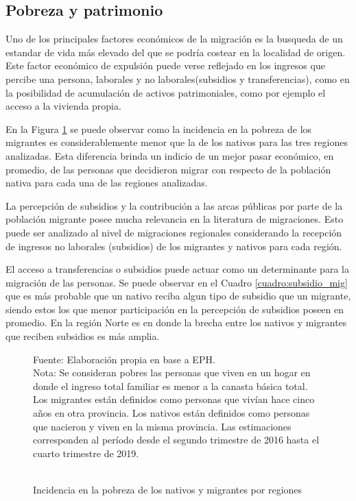\documentclass[12pt,a4paper]{article}
\begin{document}
\newpage
\subsection{Pobreza y patrimonio}

Uno de los principales factores económicos de la migración es la busqueda de un estandar de vida más elevado del que se podría costear en la localidad de origen. Este factor económico de expulsión  puede verse reflejado en los ingresos que percibe una persona, laborales y no laborales(subsidios y transferencias), como en la posibilidad de acumulación de activos patrimoniales, como por ejemplo el acceso a la vivienda propia. 

En la Figura \ref{figure:pobre_mig} se puede observar como la incidencia en la pobreza de los migrantes es considerablemente menor que la de los nativos para las tres regiones analizadas. Esta diferencia brinda un indicio de un mejor pasar económico, en promedio, de las personas que decidieron migrar con respecto de la población nativa para cada una de las regiones analizadas.

La percepción de subsidios y la contribución a las arcas públicas por parte de la población migrante posee mucha relevancia en la literatura de migraciones. Esto puede ser analizado al nivel de migraciones regionales considerando la recepción de ingresos no laborales (subsidios) de los migrantes y nativos para cada región. 


El acceso a transferencias o subsidios puede actuar como un determinante para la migración de las personas. Se puede observar en el Cuadro \ref{cuadro:subsidio_mig} que es más probable que un nativo reciba algun tipo de subsidio que un migrante, siendo estos los que menor participación en la percepción de subsidios poseen en promedio. En la región Norte es en donde la brecha entre los nativos y migrantes que reciben subsidios es más amplia.

\newpage
\begin{figure}[ht!]
\begin{center}
\caption{\\Incidencia en la pobreza de los nativos y migrantes por regiones}
\label{figure:pobre_mig}
 
\end{center}
\begin{flushleft}
\begin{scriptsize}
Fuente: Elaboración propia en base a EPH.\\
Nota: Se consideran pobres las personas que viven en un hogar en donde el ingreso total familiar es menor a la canasta básica total. Los migrantes están definidos como personas que vivían hace cinco años en otra provincia. Los nativos están definidos como personas que nacieron y viven en la misma provincia. Las estimaciones corresponden al período desde el segundo trimestre de 2016 hasta el cuarto trimestre de 2019.
\end{scriptsize}
\end{flushleft}
\end{figure}
\end{document}
